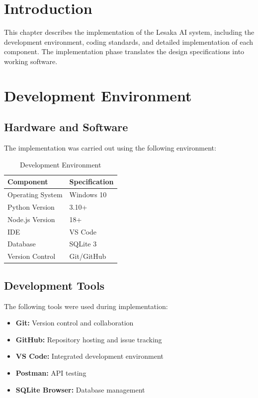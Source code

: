 
\section{Introduction}

This chapter describes the implementation of the Lesaka AI system, including the development environment, coding standards, and detailed implementation of each component. The implementation phase translates the design specifications into working software.

\section{Development Environment}

\subsection{Hardware and Software}

The implementation was carried out using the following environment:

\begin{table}[H]
\centering
\begin{tabular}{|l|l|}
\hline
\textbf{Component} & \textbf{Specification} \\
\hline
Operating System & Windows 10 \\
Python Version & 3.10+ \\
Node.js Version & 18+ \\
IDE & VS Code \\
Database & SQLite 3 \\
Version Control & Git/GitHub \\
\hline
\end{tabular}
\caption{Development Environment}
\end{table}

\subsection{Development Tools}

The following tools were used during implementation:

\begin{itemize}
    \item \textbf{Git:} Version control and collaboration
    \item \textbf{GitHub:} Repository hosting and issue tracking
    \item \textbf{VS Code:} Integrated development environment
    \item \textbf{Postman:} API testing
    \item \textbf{SQLite Browser:} Database management
\end{itemize}


